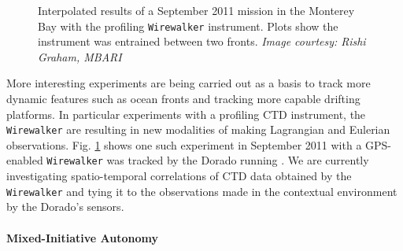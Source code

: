 \begin{figure}
\caption{\small Interpolated results of a September 2011 \rx mission
  in the Monterey Bay with the profiling \texttt{Wirewalker}
  \cite{rainville01,pinkel11} instrument. Plots show the instrument
  was entrained between two fronts. \emph{Image courtesy: Rishi
    Graham, MBARI}}
  \label{fig:sept11-wirewalker}
\end{figure}

More interesting experiments are being carried out as a basis to track
more dynamic features such as ocean fronts \cite{fronts11} and
tracking more capable drifting platforms. In particular experiments
with a profiling CTD instrument, the \texttt{Wirewalker}
\cite{rainville01,pinkel11} are resulting in new modalities of making
Lagrangian and Eulerian observations. Fig. \ref{fig:sept11-wirewalker}
shows one such experiment in September 2011 with a GPS-enabled
\texttt{Wirewalker} was tracked by the Dorado running \rxe. We are
currently investigating spatio-temporal correlations \cite{gneiting07}
of CTD data obtained by the \texttt{Wirewalker} and tying it to the
observations made in the contextual environment by the Dorado's
sensors.

\paragraph {Mixed-Initiative Autonomy}

